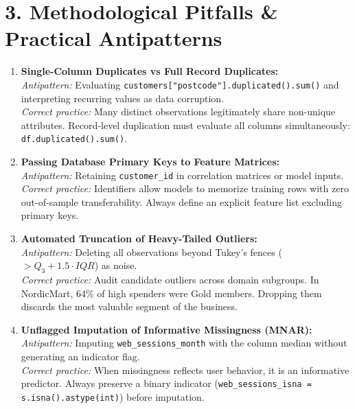 \documentclass[11pt,a4paper]{article}
\let\oldtexttt\texttt
\renewcommand{\texttt}[1]{{\color{codebase}\oldtexttt{#1}}}
\begin{document}
\vspace{0.8em}

{}
\section*{3. Methodological Pitfalls \& Practical Antipatterns}

\begin{enumerate}[leftmargin=*]
    \item \textbf{Single-Column Duplicates vs Full Record Duplicates:}\\
    \textit{Antipattern:} Evaluating \texttt{customers["postcode"].duplicated().sum()} and interpreting recurring values as data corruption.\\
    \textit{Correct practice:} Many distinct observations legitimately share non-unique attributes. Record-level duplication must evaluate all columns simultaneously: \texttt{df.duplicated().sum()}.
    
    \item \textbf{Passing Database Primary Keys to Feature Matrices:}\\
    \textit{Antipattern:} Retaining \texttt{customer\_id} in correlation matrices or model inputs.\\
    \textit{Correct practice:} Identifiers allow models to memorize training rows with zero out-of-sample transferability. Always define an explicit feature list excluding primary keys.

    \item \textbf{Automated Truncation of Heavy-Tailed Outliers:}\\
    \textit{Antipattern:} Deleting all observations beyond Tukey's fences ($> Q_3 + 1.5\cdot IQR$) as noise.\\
    \textit{Correct practice:} Audit candidate outliers across domain subgroups. In NordicMart, 64\% of high spenders were Gold members. Dropping them discards the most valuable segment of the business.

    \item \textbf{Unflagged Imputation of Informative Missingness (MNAR):}\\
    \textit{Antipattern:} Imputing \texttt{web\_sessions\_month} with the column median without generating an indicator flag.\\
    \textit{Correct practice:} When missingness reflects user behavior, it is an informative predictor. Always preserve a binary indicator (\texttt{web\_sessions\_isna = s.isna().astype(int)}) before imputation.


\end{enumerate}
\end{document}
